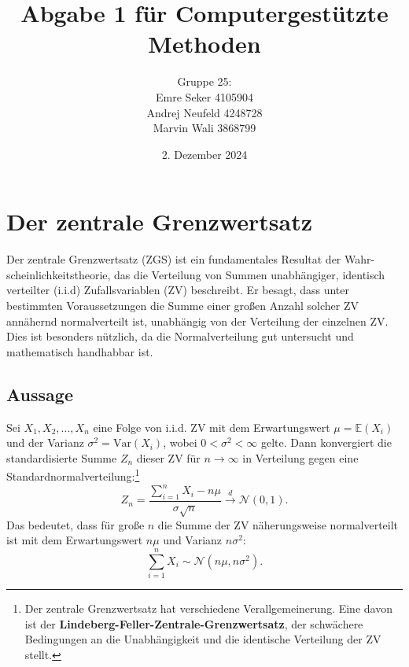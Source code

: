 \documentclass{article}
\begin{document}
\title{Abgabe 1 für Computergestützte Methoden}
\author{Gruppe 25: 
        \\Emre Seker 4105904
        \\Andrej Neufeld 4248728 
        \\Marvin Wali 3868799}

\date{2. Dezember 2024}

\maketitle
\thispagestyle{empty}
\newpage

\renewcommand{\contentsname}{Inhaltsverzeichnis}
\tableofcontents

\newpage
\section{Der zentrale Grenzwertsatz}
Der zentrale Grenzwertsatz (ZGS) ist ein fundamentales Resultat der Wahr-
scheinlichkeitstheorie, das die Verteilung von Summen unabhängiger, identisch verteilter (i.i.d) Zufallsvariablen (ZV) beschreibt.
Er besagt, dass unter bestimmten Voraussetzungen die Summe einer großen Anzahl solcher ZV annähernd normalverteilt ist, unabhängig von der Verteilung der einzelnen ZV. 
Dies ist besonders nützlich, da die Normalverteilung gut untersucht und mathematisch handhabbar ist.

\subsection{Aussage}
Sei $X_1,X_2,...,X_n$ eine Folge von i.i.d. ZV mit dem Erwartungswert $\mu =\mathbb{E}(X_i)$ und der Varianz $\sigma^2 = \text{Var}(X_i)$, wobei $0 < \sigma^2 < \infty$ gelte. Dann konvergiert die standardisierte Summe $Z_n$ dieser ZV für $n \rightarrow \infty$ in Verteilung gegen eine Standardnormalverteilung:\footnote[1]{Der zentrale Grenzwertsatz hat verschiedene Verallgemeinerung. Eine davon ist der \textbf{Lindeberg-Feller-Zentrale-Grenzwertsatz}\cite[Seite 328]{klenke}, der schwächere Bedingungen an die Unabhängigkeit und die identische Verteilung der ZV stellt.}
\begin{equation}
    \label{eq:ZGS}
    Z_n = \frac{\sum_{i=1}^n X_i -n\mu}{\sigma\sqrt{n}} \xrightarrow{d} \mathcal{N}(0,1). 
\end{equation}
Das bedeutet, dass für große $n$ die Summe der ZV näherungsweise normalverteilt ist mit dem Erwartungswert $n\mu$ und Varianz $n\sigma^2$:
\begin{equation}
    \label{eq:ZV}
    \sum_{i=1}^n X_i \sim \mathcal{N}(n\mu, n\sigma^2).
\end{equation}
\end{document}
